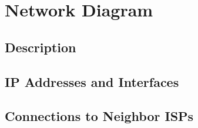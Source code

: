 \section{Network Diagram}
\label{sec:diagram}

\subsection{Description}

\subsection{IP Addresses and Interfaces}

\subsection{Connections to Neighbor ISPs}
